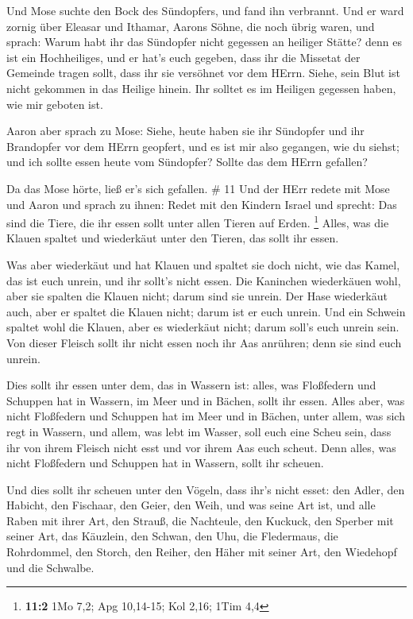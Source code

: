  Und Mose suchte den Bock des Sündopfers, und fand ihn
verbrannt. Und er ward zornig über Eleasar und Ithamar, Aarons Söhne,
die noch übrig waren, und sprach:  Warum habt ihr das
Sündopfer nicht gegessen an heiliger Stätte? denn es ist ein
Hochheiliges, und er hat's euch gegeben, dass ihr die Missetat der
Gemeinde tragen sollt, dass ihr sie versöhnet vor dem HErrn.
 Siehe, sein Blut ist nicht gekommen in das Heilige hinein.
Ihr solltet es im Heiligen gegessen haben, wie mir geboten ist.

 Aaron aber sprach zu Mose: Siehe, heute haben sie ihr
Sündopfer und ihr Brandopfer vor dem HErrn geopfert, und es ist mir also
gegangen, wie du siehst; und ich sollte essen heute vom Sündopfer?
Sollte das dem HErrn gefallen?

 Da das Mose hörte, ließ er's sich gefallen. \# 11
 Und der HErr redete mit Mose und Aaron und sprach zu ihnen:
 Redet mit den Kindern Israel und sprecht: Das sind die
Tiere, die ihr essen sollt unter allen Tieren auf Erden. \footnote{\textbf{11:2}
  1Mo 7,2; Apg 10,14-15; Kol 2,16; 1Tim 4,4}  Alles, was die
Klauen spaltet und wiederkäut unter den Tieren, das sollt ihr essen.

 Was aber wiederkäut und hat Klauen und spaltet sie doch
nicht, wie das Kamel, das ist euch unrein, und ihr sollt's nicht essen.
 Die Kaninchen wiederkäuen wohl, aber sie spalten die Klauen
nicht; darum sind sie unrein.  Der Hase wiederkäut auch,
aber er spaltet die Klauen nicht; darum ist er euch unrein. 
Und ein Schwein spaltet wohl die Klauen, aber es wiederkäut nicht; darum
soll's euch unrein sein.  Von dieser Fleisch sollt ihr nicht
essen noch ihr Aas anrühren; denn sie sind euch unrein.

 Dies sollt ihr essen unter dem, das in Wassern ist: alles,
was Floßfedern und Schuppen hat in Wassern, im Meer und in Bächen, sollt
ihr essen.  Alles aber, was nicht Floßfedern und Schuppen
hat im Meer und in Bächen, unter allem, was sich regt in Wassern, und
allem, was lebt im Wasser, soll euch eine Scheu sein,  dass
ihr von ihrem Fleisch nicht esst und vor ihrem Aas euch scheut.
 Denn alles, was nicht Floßfedern und Schuppen hat in
Wassern, sollt ihr scheuen.

 Und dies sollt ihr scheuen unter den Vögeln, dass ihr's
nicht esset: den Adler, den Habicht, den Fischaar,  den
Geier, den Weih, und was seine Art ist,  und alle Raben mit
ihrer Art,  den Strauß, die Nachteule, den Kuckuck, den
Sperber mit seiner Art,  das Käuzlein, den Schwan, den Uhu,
 die Fledermaus, die Rohrdommel,  den Storch,
den Reiher, den Häher mit seiner Art, den Wiedehopf und die Schwalbe.

